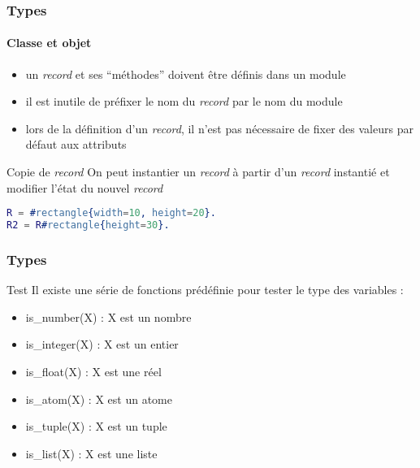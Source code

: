 \begin{frame}[fragile]
  \frametitle{Types}
  \framesubtitle{Classe et objet}

  \begin{alertblock}{}
    \begin{itemize}
    \item un \textit{record} et ses ``méthodes'' doivent être définis dans un
      module
    \item il est inutile de préfixer le nom du \textit{record} par le nom
      du module
    \item lors de la définition d'un \textit{record}, il n'est pas nécessaire de
      fixer des valeurs par défaut aux attributs
    \end{itemize}
  \end{alertblock}

  \begin{exampleblock}{Copie de \textit{record}}
    On peut instantier un \textit{record} à partir d'un \textit{record}
    instantié et modifier l'état du nouvel \textit{record}
    \begin{lstlisting}[language=erlang]
R = #rectangle{width=10, height=20}.
R2 = R#rectangle{height=30}.
    \end{lstlisting}
  \end{exampleblock}

\end{frame}

\begin{frame}[fragile]
  \frametitle{Types}

  \begin{block}{Test}
    Il existe une série de fonctions prédéfinie pour tester le type des
    variables :
    \begin{itemize}
      \item is\_number(X) : X est un nombre
      \item is\_integer(X) : X est un entier
      \item is\_float(X) : X est une réel
      \item is\_atom(X) : X est un atome
      \item is\_tuple(X) : X est un tuple
      \item is\_list(X) : X est une liste
    \end{itemize}
  \end{block}

\end{frame}
